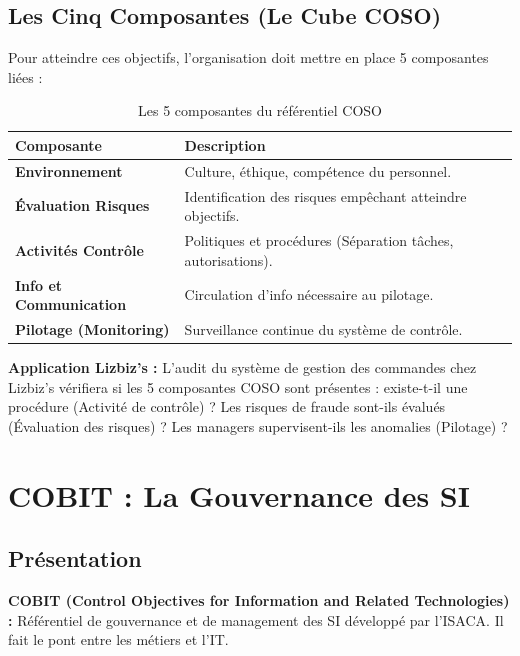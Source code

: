 \subsection{Les Cinq Composantes (Le Cube COSO)}

Pour atteindre ces objectifs, l'organisation doit mettre en place 5 composantes liées :

\begin{table}[h!]
\centering
\footnotesize
\begin{tabular}{p{3.5cm}p{7cm}}
    \toprule
    \textbf{Composante} & \textbf{Description} \\
    \midrule
    \textbf{Environnement} & Culture, éthique, compétence du personnel. \\
    \textbf{Évaluation Risques} & Identification des risques empêchant atteindre objectifs. \\
    \textbf{Activités Contrôle} & Politiques et procédures (Séparation tâches, autorisations). \\
    \textbf{Info et Communication} & Circulation d'info nécessaire au pilotage. \\
    \textbf{Pilotage (Monitoring)} & Surveillance continue du système de contrôle. \\
    \bottomrule
\end{tabular}
\caption{Les 5 composantes du référentiel COSO}
\end{table}

\begin{boxlizbiz}
\textbf{Application Lizbiz's :}
L'audit du système de gestion des commandes chez Lizbiz's vérifiera si les 5 composantes COSO sont présentes : existe-t-il une procédure (Activité de contrôle) ? Les risques de fraude sont-ils évalués (Évaluation des risques) ? Les managers supervisent-ils les anomalies (Pilotage) ?
\end{boxlizbiz}

\section{COBIT : La Gouvernance des SI}

\subsection{Présentation}

\begin{boxdef}
\textbf{COBIT (Control Objectives for Information and Related Technologies) :} Référentiel de gouvernance et de management des SI développé par l'ISACA. Il fait le pont entre les métiers et l'IT.
\end{boxdef}

